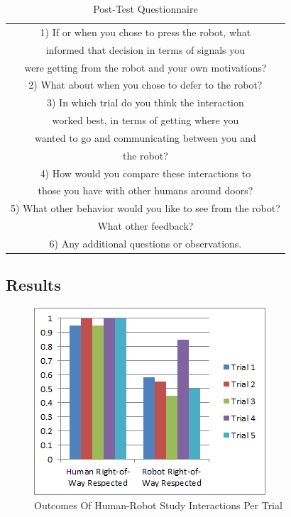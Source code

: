 \documentclass[letterpaper, 10 pt, conference]{ieeeconf}  %
\begin{document}
\begin{table}[h]
\caption{Post-Test Questionnaire}
\label{questionnaire_questions}
\begin{center}
\begin{tabular}{|c|}
\hline
1) If or when you chose to press the robot, what \\
informed that decision in terms of signals you \\
were getting from the robot and your own motivations?\\
\hline
2) What about when you chose to defer to the robot?\\
\hline
3) In which trial do you think the interaction \\
worked best, in terms of getting where you \\
wanted to go and communicating between you and \\
the robot?\\
\hline
4) How would you compare these interactions to \\
those you have with other humans around doors?\\
\hline
5) What other behavior would you like to see from the robot? \\
What other feedback?\\
\hline
6) Any additional questions or observations.\\
\hline
\end{tabular}
\end{center}
\end{table}

\subsection{Results}

     \begin{figure}
      \centering
      \includegraphics{outcomes.png}
      \caption{Outcomes Of Human-Robot Study Interactions Per Trial}
      \label{fig:Outcomes}
   \end{figure}
\end{document}
